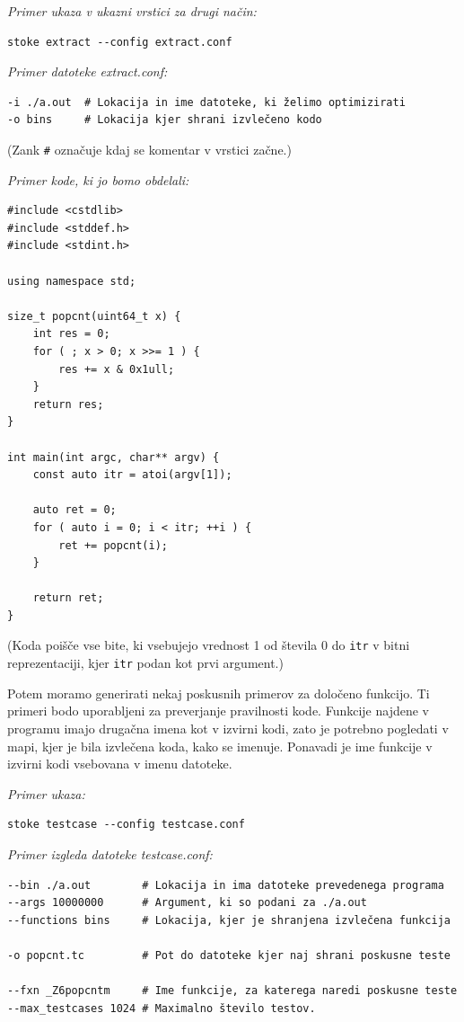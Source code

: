\documentclass[a4paper, 12pt]{book}
\begin{document}
\noindent
{\it Primer ukaza v ukazni vrstici za drugi način:}
\begin{Verbatim}[baselinestretch=1]
stoke extract --config extract.conf
\end{Verbatim}
\medskip

\noindent
{\it Primer datoteke extract.conf:}
\begin{Verbatim}[baselinestretch=1]
-i ./a.out  # Lokacija in ime datoteke, ki želimo optimizirati
-o bins     # Lokacija kjer shrani izvlečeno kodo
\end{Verbatim}
\noindent
{\small (Zank \texttt{\#} označuje kdaj se komentar v vrstici začne.)} 

\medskip

\noindent
{\it Primer kode, ki jo bomo obdelali:}
\begin{Verbatim}[baselinestretch=1]
#include <cstdlib>
#include <stddef.h>
#include <stdint.h>

using namespace std;

size_t popcnt(uint64_t x) {
	int res = 0;
	for ( ; x > 0; x >>= 1 ) {
		res += x & 0x1ull;
	}
	return res;
}

int main(int argc, char** argv) {
	const auto itr = atoi(argv[1]);

	auto ret = 0;
	for ( auto i = 0; i < itr; ++i ) {
		ret += popcnt(i);
	}

	return ret;
}
\end{Verbatim}
\noindent
{\small (Koda poišče vse bite, ki vsebujejo vrednost 1 od števila 0 do \texttt{itr} v bitni reprezentaciji, kjer \texttt{itr} podan kot prvi argument.)}

Potem moramo generirati nekaj poskusnih primerov za določeno funkcijo. Ti primeri bodo uporabljeni za preverjanje pravilnosti kode. Funkcije najdene v programu imajo drugačna imena kot v izvirni kodi, zato je potrebno pogledati v mapi, kjer je bila izvlečena koda, kako se imenuje. Ponavadi je ime funkcije v izvirni kodi vsebovana v imenu datoteke.

\medskip

\noindent
{\it Primer ukaza:}
\begin{Verbatim}[baselinestretch=1]
stoke testcase --config testcase.conf
\end{Verbatim}
\medskip

\noindent
{\it Primer izgleda datoteke testcase.conf:}
\begin{Verbatim}[baselinestretch=1]
--bin ./a.out        # Lokacija in ima datoteke prevedenega programa
--args 10000000      # Argument, ki so podani za ./a.out
--functions bins     # Lokacija, kjer je shranjena izvlečena funkcija

-o popcnt.tc         # Pot do datoteke kjer naj shrani poskusne teste

--fxn _Z6popcntm     # Ime funkcije, za katerega naredi poskusne teste
--max_testcases 1024 # Maximalno število testov.
\end{Verbatim}
\medskip
\end{document}
